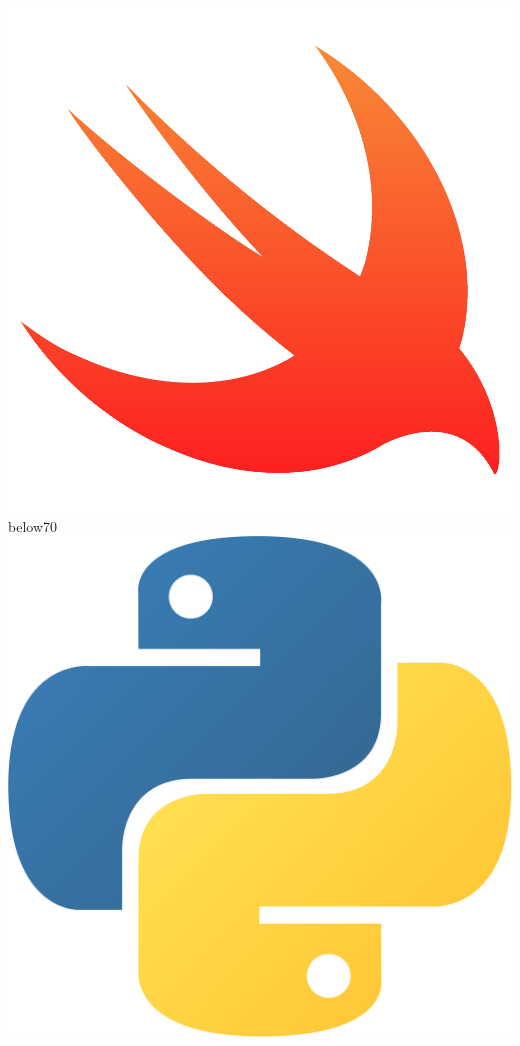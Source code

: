 \documentclass[blue]{pastelcv}
\begin{document}
\begin{paracol}{2}
  {\large\bf \includegraphics[width=\iconsizep]{swift}}
  {}{below}{70}
  {\large\bf \includegraphics[width=\iconsizep]{python}}

\end{paracol}
\end{document}
